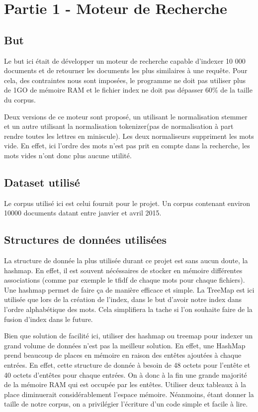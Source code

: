 \chapter{Partie 1 - Moteur de Recherche}

\section{But}
Le but ici était de développer un moteur de recherche capable d'indexer 10 000 documents et de retourner les documents les plus similaires à une requête. Pour cela, des contraintes nous sont imposées, le programme ne doit pas utiliser plus de 1GO de mémoire RAM et le fichier index ne doit pas dépasser 60\% de la taille du corpus.

Deux versions de ce moteur sont proposé, un utilisant le normalisation stemmer et un autre utilisant la normalisation tokenizer(pas de normalisation à part rendre toutes les lettres en miniscule). Les deux normaliseurs suppriment les mots vide.  En effet, ici l'ordre des mots n'est pas prit en compte dans la recherche, les mots vides n'ont donc plus aucune utilité.

\section{Dataset utilisé}
Le corpus utilisé ici est celui fournit pour le projet. Un corpus contenant environ 10000 documents datant entre janvier et avril 2015.
\section{Structures de données utilisées}

La structure de donnée la plus utilisée durant ce projet est sans aucun doute, la hashmap. En effet, il est souvent nécéssaires de stocker en mémoire différentes associations (comme par exemple le tfidf de chaque mots pour chaque fichiers). Une hashmap permet de faire ça de manière efficace et simple. 
La TreeMap est ici utilisée que lors de la création de l'index, dans le but d'avoir notre index dans l'ordre alphabétique des mots. Cela simplifiera la tache si l'on souhaite faire de la fusion d'index dans le future.

Bien que solution de facilité ici, utiliser des hashmap ou treemap pour indexer un grand volume de données n'est pas la meilleur solution. En effet, une HashMap prend beaucoup de places en mémoire en raison des entêtes ajoutées à chaque entrées. En effet, cette structure de donnée à besoin de 48 octets pour l'entête et 40 octets d'entêtes pour chaque entrées. On à donc à la fin une grande majorité de la mémoire RAM qui est occupée par les entêtes. Utiliser deux tableaux à la place diminuerait considérablement l'espace mémoire.
Néanmoins, étant donner la taille de notre corpus, on a privilégier l'écriture d'un code simple et facile à lire. 


